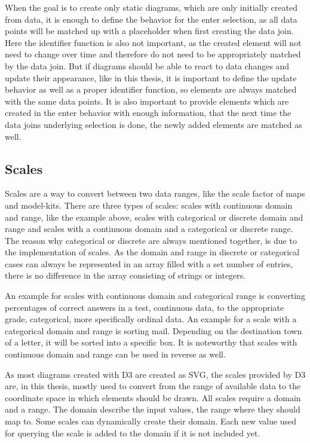 When the goal is to create only static diagrams, which are only initially created from data, it is enough to define the behavior for the enter selection, as all data points will be matched up with a placeholder when first creating the data join. Here the identifier function is also not important, as the created element will not need to change over time and therefore do not need to be appropriately matched by the data join. But if diagrams should be able to react to data changes and update their appearance, like in this thesis, it is important to define the update behavior as well as a proper identifier function, so elements are always matched with the same data points. It is also important to provide elements which are created in the enter behavior with enough information, that the next time the data joins underlying selection is done, the newly added elements are matched as well.


\subsection{Scales}

Scales are a way to convert between two data ranges, like the scale factor of maps and model-kits.
There are three types of scales: scales with continuous domain and range, like the example above, scales with categorical or discrete domain and range and scales with a continuous domain and a categorical or discrete range. The reason why categorical or discrete are always mentioned together, is due to the implementation of scales. As the domain and range in discrete or categorical cases can always be represented in an array filled with a set number of entries, there is no difference in the array consisting of strings or integers.

An example for scales with continuous domain and categorical range is converting percentages of correct answers in a test, continuous data, to the appropriate grade, categorical, more specifically ordinal data. An example for a scale with a categorical domain and range is sorting mail. Depending on the destination town of a letter, it will be sorted into a specific box.
It is noteworthy that scales with continuous domain and range can be used in reverse as well.

As most diagrams created with D3 are created as SVG, the scales provided by D3 are, in this thesis, mostly used to convert from the range of available data to the coordinate space in which elements should be drawn. All scales require a domain and a range. The domain describe the input values, the range where they should map to. Some scales can dynamically create their domain. Each new value used for querying the scale is added to the domain if it is not included yet.

